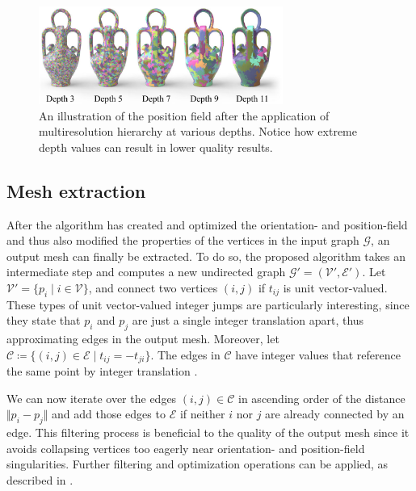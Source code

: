 \documentclass{ACGSeminar}
\begin{document}
\begin{figure}[htb!]
	\begin{centering}
		\includegraphics[width=8cm]{img/multiresolution-hierarchy-depths.png}\par
	\end{centering}
	\caption{An illustration of the position field after the application of multiresolution hierarchy at various depths. Notice how extreme depth values can result in lower quality results. \cite{jakob2015instant}}
	\label{fig:multireolution-hierarchy-depths}
\end{figure}

\subsection{Mesh extraction}
After the algorithm has created and optimized the orientation- and position-field and thus also modified the properties of the vertices in the input graph $\mathcal{G}$, an output mesh can finally be extracted. To do so, the proposed algorithm takes an intermediate step and computes a new undirected graph $\mathcal{G}' = (\mathcal{V}', \mathcal{E}')$. Let $\mathcal{V}' = \{p_i \mid i \in \mathcal{V}\}$, and connect two vertices $(i,j)$ if $t_{ij}$ is unit vector-valued. These types of unit vector-valued integer jumps are particularly interesting, since they state that $p_i$ and $p_j$ are just a single integer translation apart, thus approximating edges in the output mesh. Moreover, let $\mathcal{C} \coloneqq \{(i,j) \in \mathcal{E} \mid t_{ij} = -t_{ji}\}$. The edges in $\mathcal{C}$ have integer values that reference the same point by integer translation \cite{jakob2015instant}.

We can now iterate over the edges $(i,j) \in \mathcal{C}$ in ascending order of the distance $\Vert p_i - p_j \Vert$ and add those edges to $\mathcal{E}$ if neither $i$ nor $j$ are already connected by an edge. This filtering process is beneficial to the quality of the output mesh since it avoids collapsing vertices too eagerly near orientation- and position-field singularities. Further filtering and optimization operations can be applied, as described in \cite{jakob2015instant}.\bigskip
\end{document}
